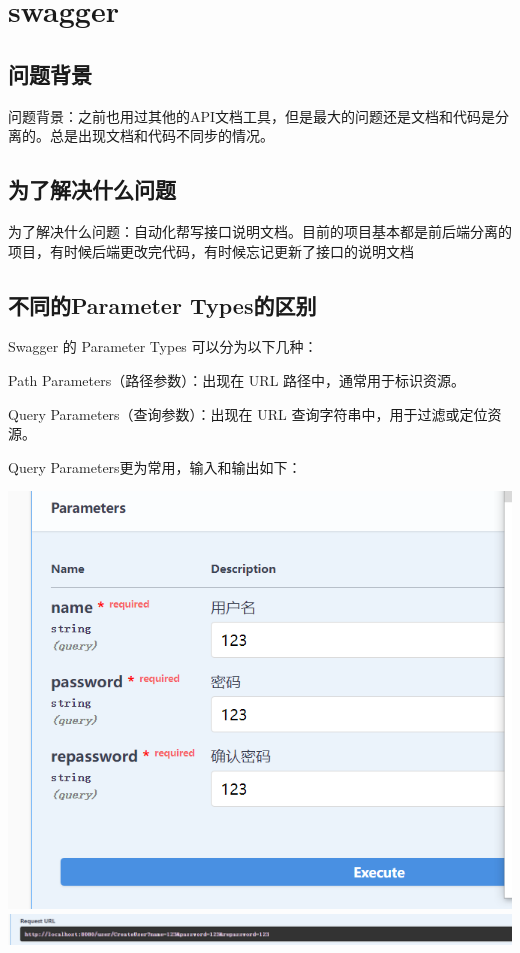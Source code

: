 \documentclass[12pt]{article}
\begin{document}
	\section{swagger}
	
	\subsection{问题背景}
	问题背景：之前也用过其他的API文档工具，但是最大的问题还是文档和代码是分离的。总是出现文档和代码不同步的情况。
	\subsection{为了解决什么问题}
	为了解决什么问题：自动化帮写接口说明文档。目前的项目基本都是前后端分离的项目，有时候后端更改完代码，有时候忘记更新了接口的说明文档
	\subsection{不同的Parameter Types的区别}
	Swagger 的 Parameter Types 可以分为以下几种：
	
	Path Parameters（路径参数）：出现在 URL 路径中，通常用于标识资源。
	
	Query Parameters（查询参数）：出现在 URL 查询字符串中，用于过滤或定位资源。
	
	Query Parameters更为常用，输入和输出如下：
	
	\includegraphics{1.png}
	\includegraphics{2.png}
	
\end{document}
